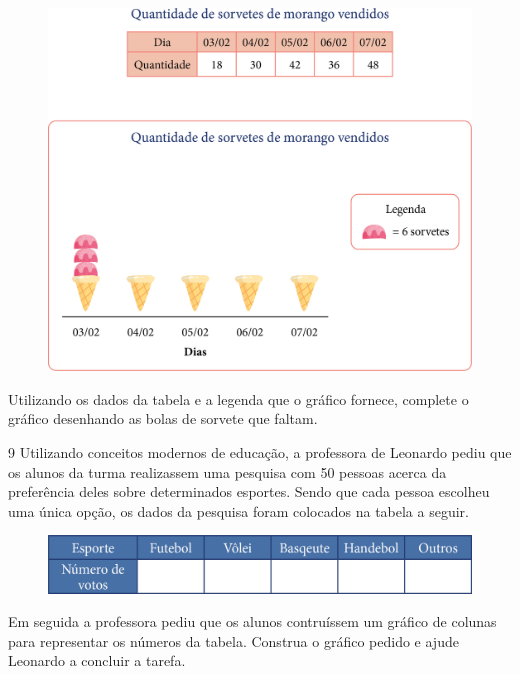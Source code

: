 \begin{figure}[htpb!]
\centering
\includegraphics[width=\textwidth]{media/image47.png}
\end{figure}

Utilizando os dados da tabela e a legenda que o gráfico fornece,
complete o gráfico desenhando as bolas de sorvete que faltam.


\pagebreak
\num{9} Utilizando conceitos modernos de educação, a professora de Leonardo
pediu que os alunos da turma realizassem uma pesquisa com 50 pessoas acerca da
preferência deles sobre determinados esportes. Sendo que cada pessoa
escolheu uma única opção, os dados da pesquisa foram colocados na tabela
a seguir.

\begin{figure}[htpb!]
\centering
\includegraphics[width=\textwidth]{media/image48.png}
\end{figure}

Em seguida a professora pediu que os alunos contruíssem um gráfico de
colunas para representar os números da tabela. Construa o gráfico pedido
e ajude Leonardo a concluir a tarefa.

